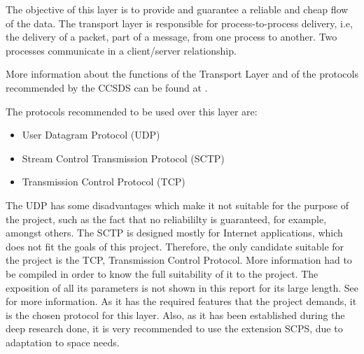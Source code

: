 The objective of this layer is to provide and guarantee a reliable and cheap flow of the data. The transport layer is responsible for process-to-process delivery, i.e, the delivery of a packet, part of a message, from one process to another. Two processes communicate in a client/server relationship. 

More information about the functions of the Transport Layer and of the protocols recommended by the CCSDS can be found at \cite[Chapter 1, Section 3]{annex3}.

The protocols recommended to be used over this layer are:

\begin{itemize}
\item User Datagram Protocol (UDP)
\item Stream Control Transmission Protocol (SCTP)
\item Transmission Control Protocol (TCP)
\end{itemize}

The UDP has some disadvantages which make it not suitable for the purpose of the project, such as the fact that no reliabililty is guaranteed, for example, amongst others. The SCTP is designed mostly for Internet applications, which does not fit the goals of this project. Therefore, the only candidate suitable for the project is the TCP, Transmission Control Protocol. More information had to be compiled in order to know the full suitability of it to the project. The exposition of all its parameters is not shown in this report for its large length. See \cite[Chapter 1, Section 3]{annex3} for more information.  As it has the required features that the project demands, it is the chosen protocol for this layer. Also, as it has been established during the deep research done, it is very recommended to use the extension SCPS, due to adaptation to space needs.  